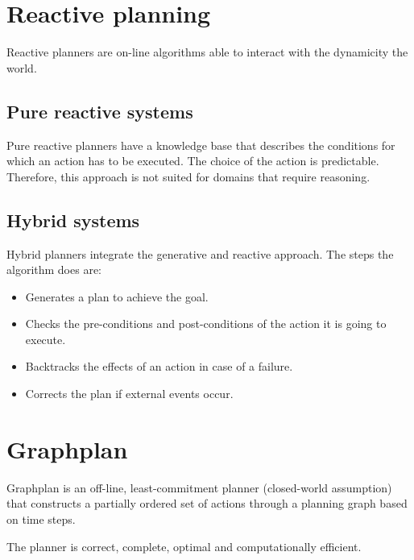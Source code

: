 \section{Reactive planning}
Reactive planners are on-line algorithms able to interact with the dynamicity the world.

\subsection{Pure reactive systems}
Pure reactive planners have a knowledge base that describes the conditions for which an action has to be executed.
The choice of the action is predictable. Therefore, this approach is not suited for domains that require reasoning.

\subsection{Hybrid systems}
Hybrid planners integrate the generative and reactive approach.
The steps the algorithm does are:
\begin{itemize}
    \item Generates a plan to achieve the goal.
    \item Checks the pre-conditions and post-conditions of the action it is going to execute.
    \item Backtracks the effects of an action in case of a failure.
    \item Corrects the plan if external events occur.
\end{itemize}



\section{Graphplan}
Graphplan is an off-line, least-commitment planner (closed-world assumption) that
constructs a partially ordered set of actions through a planning graph based on time steps.

The planner is correct, complete, optimal and computationally efficient.


